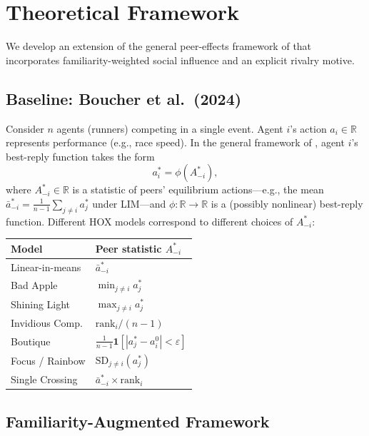 \documentclass[12pt]{article}
\theoremstyle{definition}
\theoremstyle{remark}
\begin{document}
\section{Theoretical Framework}
\label{sec:theory}

We develop an extension of the general peer-effects framework of
\citet{Boucher2024} that incorporates familiarity-weighted social influence
and an explicit rivalry motive.

\subsection{Baseline: Boucher et al.\ (2024)}

Consider $n$ agents (runners) competing in a single event.
Agent $i$'s action $a_i \in \mathbb{R}$ represents performance (e.g., race speed).
In the general framework of \citet{Boucher2024}, agent $i$'s best-reply
function takes the form
\begin{equation}
a_i^* = \phi\!\left(A_{-i}^*\right),
\label{eq:BR_Boucher}
\end{equation}
where $A_{-i}^* \in \mathbb{R}$ is a statistic of peers' equilibrium
actions---e.g., the mean $\bar{a}_{-i}^* = \frac{1}{n-1}\sum_{j\neq i}a_j^*$
under LIM---and $\phi:\mathbb{R}\to\mathbb{R}$ is a (possibly nonlinear)
best-reply function.
Different HOX models correspond to different choices of $A_{-i}^*$:

\begin{center}
\renewcommand{\arraystretch}{1.2}
\begin{tabular}{ll}
\toprule
Model & Peer statistic $A_{-i}^*$ \\
\midrule
Linear-in-means & $\bar{a}_{-i}^*$ \\
Bad Apple       & $\min_{j\neq i} a_j^*$ \\
Shining Light   & $\max_{j\neq i} a_j^*$ \\
Invidious Comp. & $\text{rank}_i / (n-1)$ \\
Boutique        & $\frac{1}{n-1}\mathbf{1}\!\left[|a_j^* - a_i^0| < \varepsilon\right]$ \\
Focus / Rainbow & $\text{SD}_{j\neq i}(a_j^*)$ \\
Single Crossing & $\bar{a}_{-i}^* \times \text{rank}_i$ \\
\bottomrule
\end{tabular}
\end{center}

\subsection{Familiarity-Augmented Framework}
\label{subsec:familiarity_model}
\end{document}
